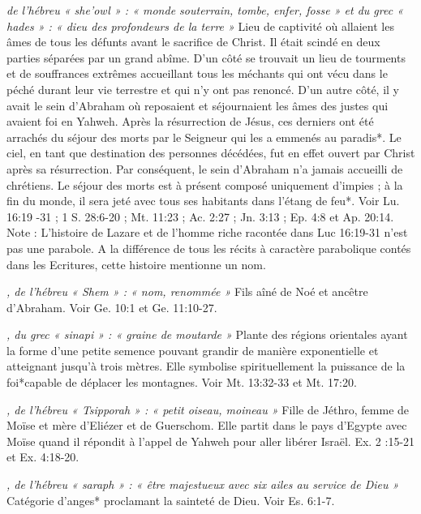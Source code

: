 \begin{multicols}{2}
{\textit{de l'hébreu « she'owl » : « monde souterrain, tombe, enfer, fosse » et du grec « hades » : « dieu des profondeurs de la terre »}\newline
Lieu de captivité où allaient les âmes de tous les défunts avant le sacrifice de Christ. Il était scindé en deux parties séparées par un grand abîme. D'un côté se trouvait un lieu de tourments et de souffrances extrêmes accueillant tous les méchants qui ont vécu dans le péché durant leur vie terrestre et qui n'y ont pas renoncé. D'un autre côté, il y avait le sein d'Abraham où reposaient et séjournaient les âmes des justes qui avaient foi en Yahweh. Après la résurrection de Jésus, ces derniers ont été arrachés du séjour des morts par le Seigneur qui les a emmenés au paradis*. Le ciel, en tant que destination des personnes décédées, fut en effet ouvert par Christ après sa résurrection. Par conséquent, le sein d'Abraham n'a jamais accueilli de chrétiens. Le séjour des morts est à présent composé uniquement d'impies ; à la fin du monde, il sera jeté avec tous ses habitants dans l'étang de feu*. Voir Lu. 16:19 -31 ; 1 S. 28:6-20 ; Mt. 11:23 ; Ac. 2:27 ; Jn. 3:13 ; Ep. 4:8 et Ap. 20:14.
\\Note : L'histoire de Lazare et de l'homme riche racontée dans Luc 16:19-31 n'est pas une parabole. A la différence de tous les récits à caractère parabolique contés dans les Ecritures, cette histoire mentionne un nom.

\textit{, de l'hébreu « Shem » : « nom, renommée »}\newline
Fils aîné de Noé et ancêtre d'Abraham. Voir Ge. 10:1 et Ge. 11:10-27.

\textit{, du grec « sinapi » : « graine de moutarde »}\newline
Plante des régions orientales ayant la forme d'une petite semence pouvant grandir de manière exponentielle et atteignant jusqu'à trois mètres. Elle symbolise spirituellement la puissance de la foi*capable de déplacer les montagnes. Voir Mt. 13:32-33 et Mt. 17:20.

\textit{, de l'hébreu « Tsipporah » : « petit oiseau, moineau »}\newline
Fille de Jéthro, femme de Moïse et mère d'Eliézer et de Guerschom. Elle partit dans le pays d'Egypte avec Moïse quand il répondit à l'appel de Yahweh pour aller libérer Israël. Ex. 2 :15-21 et Ex. 4:18-20.

\textit{, de l'hébreu « saraph » : « être majestueux avec six ailes au service de Dieu »}\newline
Catégorie d'anges* proclamant la sainteté de Dieu. Voir Es. 6:1-7.

}
\end{multicols}
